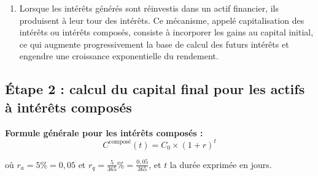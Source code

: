 \documentclass{article}
\begin{document}
\begin{enumerate}[label=\textbf{R1.\arabic*}]
                \item Lorsque les intérêts générés sont réinvestis dans un actif financier, ils produisent à leur tour des intérêts. Ce mécanisme, appelé capitalisation des intérêts ou intérêts composés, consiste à incorporer les gains au capital initial, ce qui augmente progressivement la base de calcul des futurs intérêts et engendre une croissance exponentielle du rendement.
            \end{enumerate}
            
        \subsection*{Étape 2 : calcul du capital final pour les actifs à intérêts composés}
            \noindent
            \textbf{Formule générale pour les intérêts composés :}
                \[
                C^{\text{composé}}(t) = C_0 \times (1 + r)^t
                \]

            où $r_a = 5\% = 0,05$ et \( r_q = \frac{5}{365}\% = \frac{0,05}{365} \), et \( t \) la durée exprimée en jours.
\end{document}
